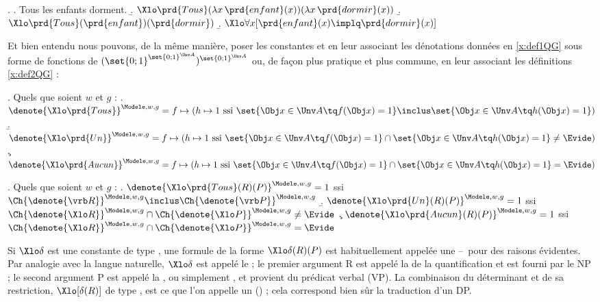 \ex. 
\a. Tous les enfants dorment. \label{x:QGx1a}
\b. \(\Xlo\prd{Tous}(\lambda x\,\prd{enfant}(x))(\lambda x\,\prd{dormir}(x))\) \label{x:QGx1b}
\b. \(\Xlo\prd{Tous}(\prd{enfant})(\prd{dormir})\) \label{x:QGx1c}
\b. \(\Xlo\forall x [\prd{enfant}(x)\implq\prd{dormir}(x)]\) \label{x:QGx1d}


\sloppy
Et bien entendu nous pouvons, de la même manière, poser les constantes  et  en leur associant les dénotations données en \ref{x:def1QG}
sous forme de fonctions de $(\set{0;1}^{\set{0;1}^{\Unv A}})^{\set{0;1}^{\Unv A}}$
ou, de façon plus pratique et plus commune, en leur associant les définitions \ref{x:def2QG} :

\fussy

\ex.
Quels que soient $w$ et $g$ :  \label{x:def1QG}
\a. \(\denote{\Xlo\prd{Tous}}^{\Modele,w,g} =
f \mapsto (h \mapsto 1 \text{ ssi }
\set{\Obj x \in \Unv A\tq f(\Obj x)=1} \inclus \set{\Obj x \in \Unv A\tq h(\Obj x)=1})\)
\b.
\(\denote{\Xlo\prd{Un}}^{\Modele,w,g}=
f \mapsto (h \mapsto 1 \text{ ssi }
\set{\Obj x \in \Unv A\tq f(\Obj x)=1} \cap \set{\Obj x \in \Unv A\tq h(\Obj x)=1} \neq \Evide)\)
\c.
\(\denote{\Xlo \prd{Aucun}}^{\Modele,w,g} = 
f \mapsto (h \mapsto 1 \text{ ssi }
\set{\Obj x \in \Unv A\tq f(\Obj x)=1} \cap \set{\Obj x \in \Unv A\tq h(\Obj x)=1} = \Evide)\)

\ex.
Quels que soient $w$ et $g$ : \label{x:def2QG}
\a. \(\denote{\Xlo\prd{Tous}(R)(P)}^{\Modele,w,g}=1\) ssi
\(\Ch{\denote{\vrb R}}^{\Modele,w,g} \inclus \Ch{\denote{\vrb P}}^{\Modele,w,g}\)
\b.
\(\denote{\Xlo\prd{Un}(R)(P)}^{\Modele,w,g}=1\) ssi
\(\Ch{\denote{\Xlo R}}^{\Modele,w,g} \cap \Ch{\denote{\Xlo P}}^{\Modele,w,g} \neq \Evide\)
\c.
\(\denote{\Xlo \prd{Aucun}(R)(P)}^{\Modele,w,g}=1\) ssi
\(\Ch{\denote{\Xlo R}}^{\Modele,w,g} \cap \Ch{\denote{\Xlo P}}^{\Modele,w,g} = \Evide\)


Si $\Xlo\delta$ %
est une constante de type \type{\et,\ett}, une formule de la forme \(\Xlo\delta(R)(P)\) est habituellement appelée une  --~pour des raisons évidentes.  Par analogie avec la langue naturelle, $\Xlo\delta$ est appelé le  ; le premier argument \vrb R est appelé la  de la quantification et est fourni par le NP ; le second argument \vrb P est appelé la , ou simplement , et provient du prédicat verbal (VP). 
La combinaison du déterminant et de sa restriction, $\Xlo[\delta(R)]$ de type \ett, est ce que l'on appelle un  () ; cela correspond bien sûr la traduction d'un DP.

